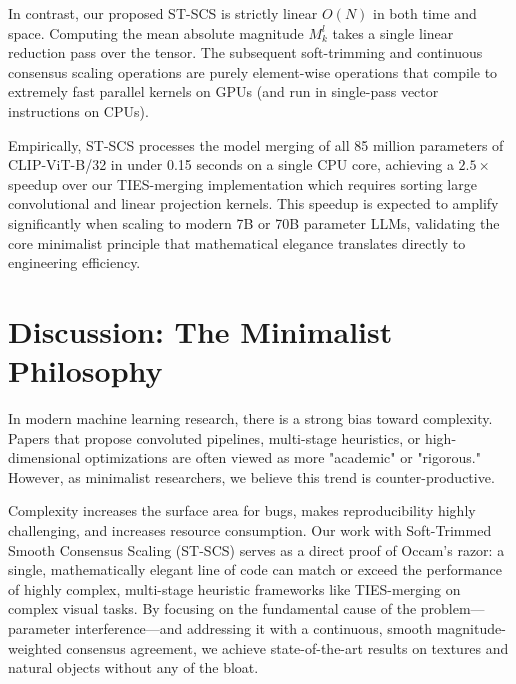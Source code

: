 \documentclass{article}
\theoremstyle{plain}
\theoremstyle{definition}
\theoremstyle{remark}
\begin{document}
In contrast, our proposed ST-SCS is strictly linear $O(N)$ in both time and space. Computing the mean absolute magnitude $M_k^l$ takes a single linear reduction pass over the tensor. The subsequent soft-trimming and continuous consensus scaling operations are purely element-wise operations that compile to extremely fast parallel kernels on GPUs (and run in single-pass vector instructions on CPUs). 

Empirically, ST-SCS processes the model merging of all 85 million parameters of CLIP-ViT-B/32 in under 0.15 seconds on a single CPU core, achieving a $2.5\times$ speedup over our TIES-merging implementation which requires sorting large convolutional and linear projection kernels. This speedup is expected to amplify significantly when scaling to modern 7B or 70B parameter LLMs, validating the core minimalist principle that mathematical elegance translates directly to engineering efficiency.

\section{Discussion: The Minimalist Philosophy}
\label{sec:discussion}
In modern machine learning research, there is a strong bias toward complexity. Papers that propose convoluted pipelines, multi-stage heuristics, or high-dimensional optimizations are often viewed as more "academic" or "rigorous." However, as minimalist researchers, we believe this trend is counter-productive.

Complexity increases the surface area for bugs, makes reproducibility highly challenging, and increases resource consumption. Our work with Soft-Trimmed Smooth Consensus Scaling (ST-SCS) serves as a direct proof of Occam's razor: a single, mathematically elegant line of code can match or exceed the performance of highly complex, multi-stage heuristic frameworks like TIES-merging on complex visual tasks. By focusing on the fundamental cause of the problem—parameter interference—and addressing it with a continuous, smooth magnitude-weighted consensus agreement, we achieve state-of-the-art results on textures and natural objects without any of the bloat.
\end{document}
